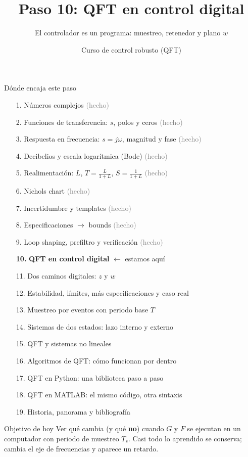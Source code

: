 \documentclass[aspectratio=169,11pt]{beamer}
\title[QFT en control digital]{Paso 10: QFT en control digital}
\subtitle{El controlador es un programa: muestreo, retenedor y plano $w$}
\author{Curso de control robusto (QFT)}
\date{}
\begin{document}
\begin{frame}\titlepage\end{frame}

\begin{frame}{Dónde encaja este paso}
  \tiny
  \begin{enumerate}\setlength{\itemsep}{-2pt}
    \item[1.] Números complejos \hfill \textcolor{gray}{(hecho)}
    \item[2.] Funciones de transferencia: $s$, polos y ceros \hfill \textcolor{gray}{(hecho)}
    \item[3.] Respuesta en frecuencia: $s=j\omega$, magnitud y fase \hfill \textcolor{gray}{(hecho)}
    \item[4.] Decibelios y escala logarítmica (Bode) \hfill \textcolor{gray}{(hecho)}
    \item[5.] Realimentación: $L$, $T=\frac{L}{1+L}$, $S=\frac{1}{1+L}$ \hfill \textcolor{gray}{(hecho)}
    \item[6.] Nichols chart \hfill \textcolor{gray}{(hecho)}
    \item[7.] Incertidumbre y templates \hfill \textcolor{gray}{(hecho)}
    \item[8.] Especificaciones $\rightarrow$ bounds \hfill \textcolor{gray}{(hecho)}
    \item[9.] Loop shaping, prefiltro y verificación \hfill \textcolor{gray}{(hecho)}
    \item[\textbf{10.}] \textbf{QFT en control digital} \hfill $\leftarrow$ estamos aquí
    \item[11.] Dos caminos digitales: $z$ y $w$
    \item[12.] Estabilidad, límites, más especificaciones y caso real
    \item[13.] Muestreo por eventos con periodo base $T$
    \item[14.] Sistemas de dos estados: lazo interno y externo
    \item[15.] QFT y sistemas no lineales
    \item[16.] Algoritmos de QFT: cómo funcionan por dentro
    \item[17.] QFT en Python: una biblioteca paso a paso
    \item[18.] QFT en MATLAB: el mismo código, otra sintaxis
    \item[19.] Historia, panorama y bibliografía
  \end{enumerate}
  \vspace{2pt}
  \begin{block}{Objetivo de hoy}
    Ver qué cambia (y qué \textbf{no}) cuando $G$ y $F$ se ejecutan en un computador con periodo de muestreo $T_s$. Casi todo lo aprendido se conserva; cambia el eje de frecuencias y aparece un retardo.
  \end{block}
\end{frame}
\end{document}
